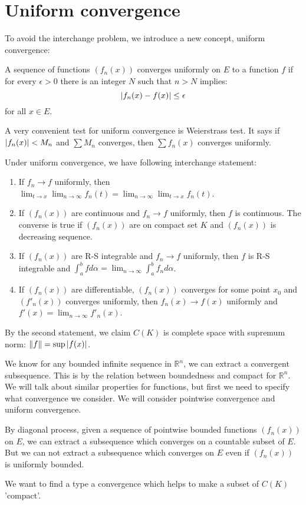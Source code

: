 \section{Uniform convergence}
To avoid the interchange problem, we introduce a new concept, uniform convergence:
\begin{definition}
    A sequence of functions $(f_n(x))$ converges uniformly on $E$ to a function $f$ if for every $\epsilon>0$ there is an integer $N$ such that $n>N$ implies:
    \begin{equation*}
        \left\lvert f_n(x)-f(x)\right\rvert\leq \epsilon
    \end{equation*}
    for all $x\in E$.
\end{definition}
A very convenient test for uniform convergence is Weierstrass test. It says if $\left\lvert f_n(x)\right\rvert<M_n$ and $\sum M_n$ converges, then $\sum f_n(x)$ converges uniformly.\par
Under uniform convergence, we have following interchange statement:
\begin{enumerate}
    \item If $f_n\to f$ uniformly, then $\lim_{t\to x}\lim_{n\to \infty}f_n(t)=\lim_{n\to \infty}\lim_{t\to x}f_n(t)$.
    \item If $(f_n(x))$ are continuous and $f_n\to f$ uniformly, then $f$ is continuous. The converse is true if $(f_n(x))$ are on compact set $K$ and $(f_n(x))$ is decreasing sequence.
    \item If $(f_n(x))$ are R-S integrable and $f_n\to f$ uniformly, then $f$ is R-S integrable and $\int_{a}^{b}fd\alpha=\lim_{n\to \infty}\int_{a}^{b}f_n d\alpha$.
    \item If $(f_n(x))$ are differentiable, $(f_n(x))$ converges for some point $x_0$ and $(f'_n(x))$ converges uniformly, then $f_n(x)\to f(x)$ uniformly and $f'(x)=\lim_{n\to\infty}f'_n(x)$.
\end{enumerate}
By the second statement, we claim $C(K)$ is complete space with supremum norm: $\lVert f\rVert=\sup\left\lvert f(x)\right\rvert$.\par
We know for any bounded infinite sequence in $\mathbb{R}^n$, we can extract a convergent subsequence. This is by the relation between boundedness and compact for $\mathbb{R}^n$. We will talk about similar properties for functions, but first we need to specify what convergence we consider. We will consider pointwise convergence and uniform convergence.\par 
By diagonal process, given a sequence of pointwise bounded functions $(f_n(x))$ on $E$, we can extract a subsequence which converges on a countable subset of $E$. But we can not extract a subsequence which converges on $E$ even if  $(f_n(x))$ is uniformly bounded. \par
We want to find a type a convergence which helps to make a subset of $C(K)$ 'compact'.
